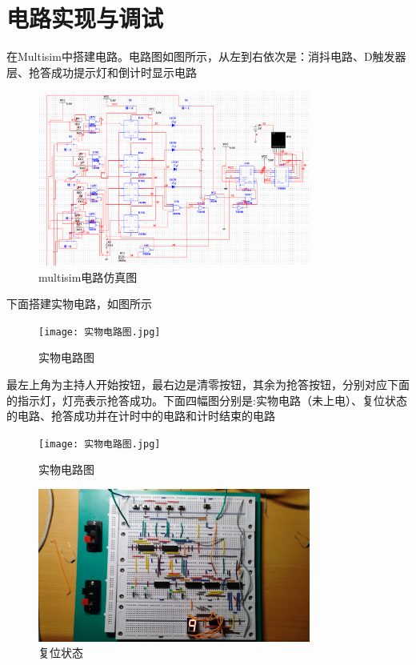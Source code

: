 \documentclass{ctexart}
\begin{document}
\section{电路实现与调试}
在Multisim中搭建电路。电路图如图所示，从左到右依次是：消抖电路、D触发器层、抢答成功提示灯和倒计时显示电路
\begin{figure}[H]
    \centering
    \includegraphics[width=0.8\textwidth]{multisim.png}
    \caption{multisim电路仿真图}
\end{figure}
下面搭建实物电路，如图所示
\begin{figure}[H]
    \centering
    \texttt{[image: 实物电路图.jpg]}
    \caption{实物电路图}
\end{figure}
最左上角为主持人开始按钮，最右边是清零按钮，其余为抢答按钮，分别对应下面的指示灯，灯亮表示抢答成功。下面四幅图分别是:实物电路（未上电）、复位状态的电路、抢答成功并在计时中的电路和计时结束的电路
\begin{figure}[H]
    \centering
    \begin{minipage}{0.45\textwidth}
    \centering
           \texttt{[image: 实物电路图.jpg]}
           \caption{实物电路图}
    \label{}
    \end{minipage}
    \hspace{0.05\textwidth}
    \begin{minipage}{0.45\textwidth}
    \centering
           \includegraphics[width=0.8\textwidth]{复位状态.jpg}
           \caption{复位状态}
    \label{7474}
    \end{minipage}
\end{figure}
\end{document}

